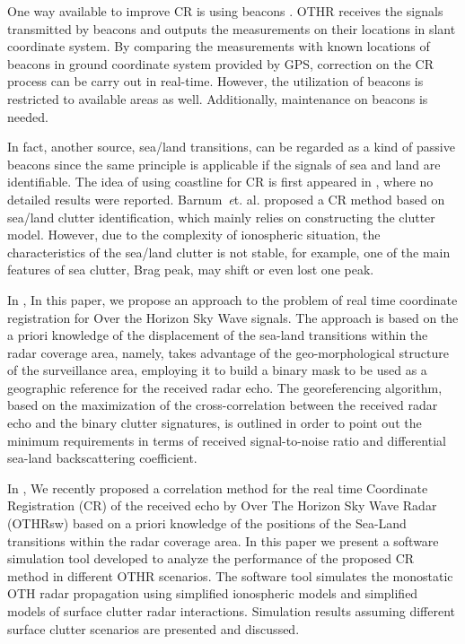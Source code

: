 One way available to improve CR is using beacons \cite{weijers1995oth}. OTHR receives the signals transmitted by beacons and outputs the measurements on their locations in slant coordinate system. By comparing the measurements with known locations of beacons in ground coordinate system provided by GPS,
correction on the CR process can be carry out in real-time. However, the utilization of beacons is restricted to available areas as well.
Additionally, maintenance on beacons is needed.

In fact, another source, sea/land transitions, can be regarded as a kind of passive beacons since the same principle is applicable if the signals of sea and land are identifiable. The idea of using coastline for CR is first appeared in \cite{wheadon1994ionospheric, anderson1995auto}, where no detailed results were reported. Barnum~{\emph et. al.} \cite{barnum1998over} proposed a CR method based on sea/land clutter identification, which mainly relies on constructing the clutter model. However, due to the complexity of ionospheric situation, the characteristics of the sea/land clutter is not stable, for example, one of the main features of sea clutter, Brag peak, may shift or even lost one peak.


In \cite{cuccoli2009over, cuccoli2009over2, cuccoli2010sea, cuccoli2011coordinate}, In this paper, we propose an approach to the problem of real time coordinate registration for Over the Horizon Sky Wave signals. The approach is based on the a priori knowledge of the displacement of the sea-land transitions within the radar coverage area, namely, takes advantage of the geo-morphological structure of the surveillance area, employing it to build a binary mask to be used as a geographic reference for the received radar echo. The georeferencing algorithm, based on the maximization of the cross-correlation between the received radar echo and the binary clutter signatures, is outlined in order to point out the minimum requirements in terms of received signal-to-noise ratio and differential sea-land backscattering coefficient.

In \cite{cuccoli2009over2},
We recently proposed a correlation method for the
real time Coordinate Registration (CR) of the received echo by
Over The Horizon Sky Wave Radar (OTHRsw) based on a priori
knowledge of the positions of the Sea-Land transitions within the
radar coverage area.
In this paper we present a software simulation tool developed to
analyze the performance of the proposed CR method in different
OTHR scenarios. The software tool simulates the monostatic
OTH radar propagation using simplified ionospheric models and
simplified models of surface clutter radar interactions.
Simulation results assuming different surface clutter scenarios
are presented and discussed.

